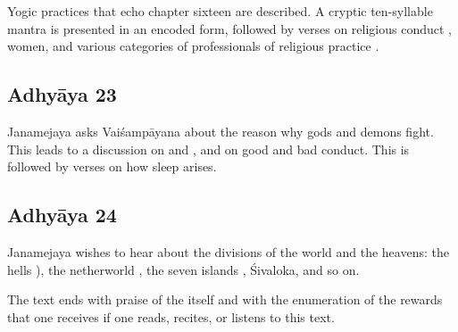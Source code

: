 Yogic practices that echo chapter sixteen are described.
A cryptic ten-syllable mantra is presented in an encoded form, followed by
verses on religious conduct , women, and various categories of
professionals of religious practice .

\subsection*{Adhyāya 23}\label{contents_of_ch23}
Janamejaya asks Vaiśampāyana about the reason why gods and demons fight. 
This leads to a discussion on  and , and on good and bad conduct.
This is followed by verses on how sleep arises.

\subsection*{Adhyāya 24}\label{contents_of_ch24}
Janamejaya wishes to hear about the divisions of the world and the heavens: the hells ),
the netherworld , the seven islands , Śivaloka, and so on.

The text ends with praise of the  itself and with the enumeration of the rewards
that one receives if one reads, recites, or listens to this text.

\vfill
\pagebreak





